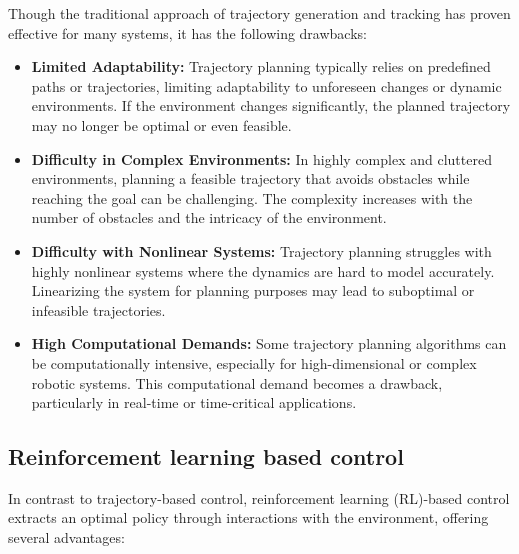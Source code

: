 Though the traditional approach of trajectory generation and tracking has proven effective for many systems, it has the following drawbacks:
\begin{itemize}
    \item \textbf{Limited Adaptability:}
    Trajectory planning typically relies on predefined paths or trajectories, limiting adaptability to unforeseen changes or dynamic environments. If the environment changes significantly, the planned trajectory may no longer be optimal or even feasible.
    
    \item \textbf{Difficulty in Complex Environments:}
    In highly complex and cluttered environments, planning a feasible trajectory that avoids obstacles while reaching the goal can be challenging. The complexity increases with the number of obstacles and the intricacy of the environment.
    
    \item \textbf{Difficulty with Nonlinear Systems:}
    Trajectory planning struggles with highly nonlinear systems where the dynamics are hard to model accurately. Linearizing the system for planning purposes may lead to suboptimal or infeasible trajectories.
    
    \item \textbf{High Computational Demands:}
    Some trajectory planning algorithms can be computationally intensive, especially for high-dimensional or complex robotic systems. This computational demand becomes a drawback, particularly in real-time or time-critical applications.
\end{itemize}

\subsection{Reinforcement learning based control}
In contrast to trajectory-based control, reinforcement learning (RL)-based control extracts an optimal policy through interactions with the environment, offering several advantages:

